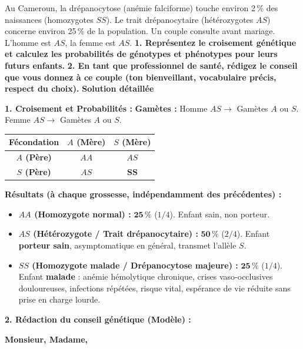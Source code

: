 \documentclass[11pt]{article}
\begin{document}
\begin{exoresolu}
Au Cameroun, la drépanocytose (anémie falciforme) touche environ \num{2}\,\% des naissances (homozygotes $SS$). Le trait drépanocytaire (hétérozygotes $AS$) concerne environ \num{25}\,\% de la population. Un couple consulte avant mariage. L'homme est $AS$, la femme est $AS$.
\textbf{1. Représentez le croisement génétique et calculez les probabilités de génotypes et phénotypes pour leurs futurs enfants.}
\textbf{2. En tant que professionnel de santé, rédigez le conseil que vous donnez à ce couple (ton bienveillant, vocabulaire précis, respect du choix).}
\tcblower
\textbf{Solution détaillée}

\textbf{1. Croisement et Probabilités :}
\textbf{Gamètes :} Homme $AS \rightarrow$ Gamètes $A$ ou $S$. Femme $AS \rightarrow$ Gamètes $A$ ou $S$.

\begin{center}
\begin{tabular}{|c|c|c|}\hline
\rowcolor{popblueL} \textbf{Fécondation} & \textbf{$A$ (Mère)} & \textbf{$S$ (Mère)} \\ \hline
\textbf{$A$ (Père)} & $AA$ & $AS$ \\ \hline
\textbf{$S$ (Père)} & $AS$ & $\mathbf{SS}$ \\ \hline
\end{tabular}
\end{center}

\textbf{Résultats (à chaque grossesse, indépendamment des précédentes) :}
\begin{itemize}
    \item \textbf{$AA$ (Homozygote normal) :} $\mathbf{\num{25}\,\%}$ ($1/4$). Enfant sain, non porteur.
    \item \textbf{$AS$ (Hétérozygote / Trait drépanocytaire) :} $\mathbf{\num{50}\,\%}$ ($2/4$). Enfant \textbf{porteur sain}, asymptomatique en général, transmet l'allèle $S$.
    \item \textbf{$SS$ (Homozygote malade / Drépanocytose majeure) :} $\mathbf{\num{25}\,\%}$ ($1/4$). Enfant \textbf{malade} : anémie hémolytique chronique, crises vaso-occlusives douloureuses, infections répétées, risque vital, espérance de vie réduite sans prise en charge lourde.
\end{itemize}

\textbf{2. Rédaction du conseil génétique (Modèle) :}

\og \textbf{Monsieur, Madame,}


\end{exoresolu}
\end{document}

